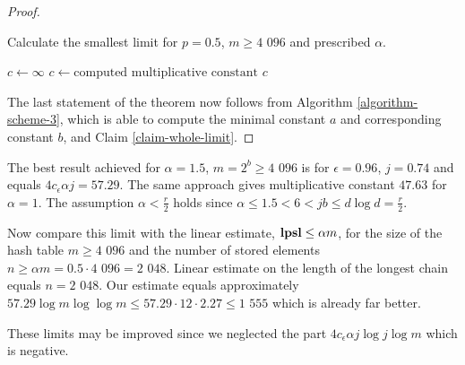 \begin{proof}
\begin{algorithm}[H]
\caption{Calculate the smallest limit for $p=0.5$, $m \geq \text{4 096}$ and prescribed $\alpha$.}
\label{algorithm-scheme-3}
\begin{algorithmic}
\STATE $c \leftarrow \infty$
				\STATE $c \leftarrow \text{computed multiplicative constant}$
			\ENDIF
		\ENDFOR
	\ENDFOR
\ENDFOR
\STATE
\RETURN $c$
\end{algorithmic}
\end{algorithm}

The last statement of the theorem now follows from Algorithm \ref{algorithm-scheme-3}, which is able to compute the minimal constant $a$ and corresponding constant $b$, and Claim \ref{claim-whole-limit}.
\end{proof}

The best result achieved for $\alpha = 1.5$, $m = 2 ^ b \geq \text{4 096}$ is for $\epsilon = 0.96$, $j = 0.74$ and equals $4 c_\epsilon \alpha j = 57.29$. The same approach gives multiplicative constant $47.63$ for $\alpha = 1$. The assumption $\alpha < \frac{r}{2}$ holds since $\alpha \leq 1.5 < 6 < jb \leq d \log d = \frac{r}{2}$.

Now compare this limit with the linear estimate, $\mathbf{lpsl} \leq \alpha m$, for the size of the hash table $m \geq \text{4 096}$ and the number of stored elements $n \geq \alpha m = 0.5 \cdot \text{4 096} = \text{2 048}$. Linear estimate on the length of the longest chain equals $n = \text{2 048}$. Our estimate equals approximately $57.29 \log m \log \log m \leq 57.29 \cdot 12 \cdot 2.27 \leq \text{1 555}$ which is already far better. 

These limits may be improved since we neglected the part $4 c_\epsilon \alpha j \log j \log m$ which is negative.


